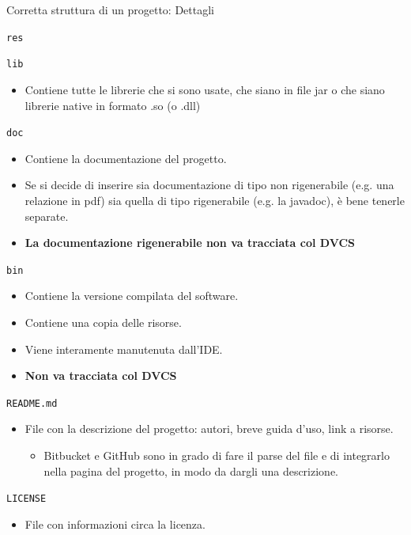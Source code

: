 \documentclass[presentation]{beamer}
\begin{document}
\begin{frame}[allowframebreaks]{Corretta struttura di un progetto: Dettagli}
\begin{block}{\texttt{res}}
\begin{itemize}
		\end{itemize}
	\end{block}
	\begin{block}{\texttt{lib}}
		\begin{itemize}
			\item	Contiene tutte le librerie che si sono usate, che siano in file jar o che siano librerie native in formato .so (o .dll)
		\end{itemize}
	\end{block}
	\begin{block}{\texttt{doc}}
		\begin{itemize}
			\item Contiene la documentazione del progetto.
			\item Se si decide di inserire sia documentazione di tipo non rigenerabile (e.g. una relazione in pdf) sia quella di tipo rigenerabile (e.g. la javadoc), è bene tenerle separate.
			\item \textbf{La documentazione rigenerabile non va tracciata col DVCS}
		\end{itemize}
	\end{block}
	\begin{block}{\texttt{bin}}
		\begin{itemize}
			\item Contiene la versione compilata del software.
			\item Contiene una copia delle risorse.
			\item Viene interamente manutenuta dall'IDE.
			\item \textbf{Non va tracciata col DVCS}
		\end{itemize}
	\end{block}
	\begin{block}{\texttt{README.md}}
		\begin{itemize}
			\item File con la descrizione del progetto: autori, breve guida d'uso, link a risorse.
			\begin{itemize}
				\item Bitbucket e GitHub sono in grado di fare il parse del file e di integrarlo nella pagina del progetto, in modo da dargli una descrizione.
			\end{itemize} 
		\end{itemize} 
	\end{block}
	\begin{block}{\texttt{LICENSE}}
		\begin{itemize}
			\item File con informazioni circa la licenza.

\end{itemize}
\end{block}
\end{frame}
\end{document}
